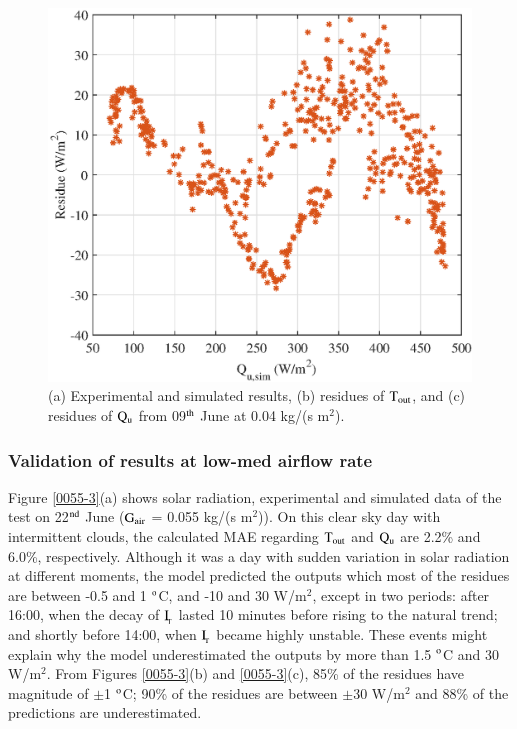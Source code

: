 \begin{figure}[ht!]
\begin{minipage}{0.39\columnwidth}
		\includegraphics[scale=0.5,width=1.0\columnwidth]{figs/004-residue-6.eps}
	\end{minipage}
	
	\caption{(a) Experimental and simulated results, (b) residues of $\rm{T_{out}}$, and (c) residues of $\rm{Q_{u}}$ from 09$^{\rm{th}}$ June at 0.04 kg/(s m$^2$).}
	\label{004-3}
\end{figure}


\subsubsection{Validation of results at low-med airflow rate}

Figure \ref{0055-3}(a) shows solar radiation, experimental and simulated data of the test on 22$^{\rm{nd}}$ June ($\rm{G_{air}}$ = 0.055 kg/(s m$^2$)). On this clear sky day with intermittent clouds, the calculated MAE regarding $\rm{T_{out}}$ and $\rm{Q_{u}}$ are 2.2\% and 6.0\%, respectively. Although it was a day with sudden variation in solar radiation at different moments, the model predicted the outputs which most of the residues are between -0.5 and 1 $^{\rm{o}}$C, and -10 and 30 W/m$^2$, except in two periods: after 16:00, when the decay of $\rm{I_{\!_T}}$ lasted 10 minutes before rising to the natural trend; and shortly before 14:00, when $\rm{I_{\!_T}}$ became highly unstable. These events might explain why the model underestimated the outputs by more than 1.5 $^{\rm{o}}$C and 30 W/m$^2$. From Figures \ref{0055-3}(b) and \ref{0055-3}(c), 85\% of the residues have magnitude of $\pm$1 $^{\rm{o}}$C;  90\% of the residues are between $\pm$30 W/m$^2$ and 88\% of the predictions are underestimated.

